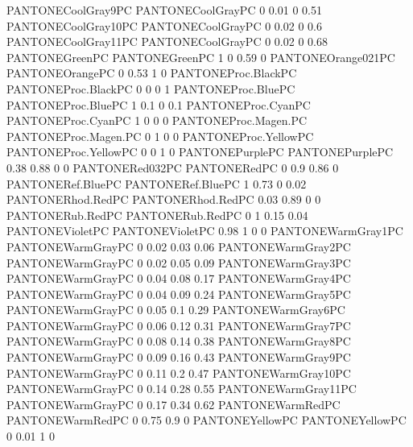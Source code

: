  {PANTONECoolGray9PC} {PANTONE\SpotSpace Cool\SpotSpace Gray\SpotSpace PC} {0 0.01 0 0.51}
 {PANTONECoolGray10PC} {PANTONE\SpotSpace Cool\SpotSpace Gray\SpotSpace PC} {0 0.02 0 0.6}
 {PANTONECoolGray11PC} {PANTONE\SpotSpace Cool\SpotSpace Gray\SpotSpace PC} {0 0.02 0 0.68}
 {PANTONEGreenPC} {PANTONE\SpotSpace Green\SpotSpace PC} {1 0 0.59 0}
 {PANTONEOrange021PC} {PANTONE\SpotSpace Orange\SpotSpace PC} {0 0.53 1 0}
 {PANTONEProc.BlackPC} {PANTONE\SpotSpace Proc.\SpotSpace Black\SpotSpace PC} {0 0 0 1}
 {PANTONEProc.BluePC} {PANTONE\SpotSpace Proc.\SpotSpace Blue\SpotSpace PC} {1 0.1 0 0.1}
 {PANTONEProc.CyanPC} {PANTONE\SpotSpace Proc.\SpotSpace Cyan\SpotSpace PC} {1 0 0 0}
 {PANTONEProc.Magen.PC} {PANTONE\SpotSpace Proc.\SpotSpace Magen.\SpotSpace PC} {0 1 0 0}
 {PANTONEProc.YellowPC} {PANTONE\SpotSpace Proc.\SpotSpace Yellow\SpotSpace PC} {0 0 1 0}
 {PANTONEPurplePC} {PANTONE\SpotSpace Purple\SpotSpace PC} {0.38 0.88 0 0}
 {PANTONERed032PC} {PANTONE\SpotSpace Red\SpotSpace PC} {0 0.9 0.86 0}
 {PANTONERef.BluePC} {PANTONE\SpotSpace Ref.\SpotSpace Blue\SpotSpace PC} {1 0.73 0 0.02}
 {PANTONERhod.RedPC} {PANTONE\SpotSpace Rhod.\SpotSpace Red\SpotSpace PC} {0.03 0.89 0 0}
 {PANTONERub.RedPC} {PANTONE\SpotSpace Rub.\SpotSpace Red\SpotSpace PC} {0 1 0.15 0.04}
 {PANTONEVioletPC} {PANTONE\SpotSpace Violet\SpotSpace PC} {0.98 1 0 0}
 {PANTONEWarmGray1PC} {PANTONE\SpotSpace Warm\SpotSpace Gray\SpotSpace PC} {0 0.02 0.03 0.06}
 {PANTONEWarmGray2PC} {PANTONE\SpotSpace Warm\SpotSpace Gray\SpotSpace PC} {0 0.02 0.05 0.09}
 {PANTONEWarmGray3PC} {PANTONE\SpotSpace Warm\SpotSpace Gray\SpotSpace PC} {0 0.04 0.08 0.17}
 {PANTONEWarmGray4PC} {PANTONE\SpotSpace Warm\SpotSpace Gray\SpotSpace PC} {0 0.04 0.09 0.24}
 {PANTONEWarmGray5PC} {PANTONE\SpotSpace Warm\SpotSpace Gray\SpotSpace PC} {0 0.05 0.1 0.29}
 {PANTONEWarmGray6PC} {PANTONE\SpotSpace Warm\SpotSpace Gray\SpotSpace PC} {0 0.06 0.12 0.31}
 {PANTONEWarmGray7PC} {PANTONE\SpotSpace Warm\SpotSpace Gray\SpotSpace PC} {0 0.08 0.14 0.38}
 {PANTONEWarmGray8PC} {PANTONE\SpotSpace Warm\SpotSpace Gray\SpotSpace PC} {0 0.09 0.16 0.43}
 {PANTONEWarmGray9PC} {PANTONE\SpotSpace Warm\SpotSpace Gray\SpotSpace PC} {0 0.11 0.2 0.47}
 {PANTONEWarmGray10PC} {PANTONE\SpotSpace Warm\SpotSpace Gray\SpotSpace PC} {0 0.14 0.28 0.55}
 {PANTONEWarmGray11PC} {PANTONE\SpotSpace Warm\SpotSpace Gray\SpotSpace PC} {0 0.17 0.34 0.62}
 {PANTONEWarmRedPC} {PANTONE\SpotSpace Warm\SpotSpace Red\SpotSpace PC} {0 0.75 0.9 0}
 {PANTONEYellowPC} {PANTONE\SpotSpace Yellow\SpotSpace PC} {0 0.01 1 0}
